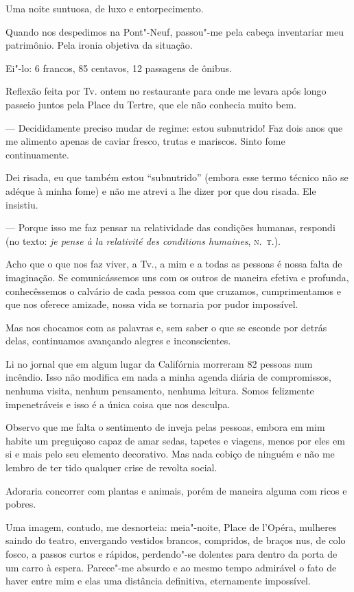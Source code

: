 Uma noite suntuosa, de luxo e entorpecimento.

Quando nos despedimos na Pont"-Neuf, passou"-me pela cabeça inventariar
meu patrimônio. Pela ironia objetiva da situação.

Ei"-lo: 6 francos, 85 centavos, 12 passagens de ônibus.

\pagebreak
\asterisc

Reflexão feita por Tv. ontem no restaurante para onde me levara após
longo passeio juntos pela Place du Tertre, que ele não conhecia muito
bem.

--- Decididamente preciso mudar de regime: estou subnutrido! Faz dois anos que me alimento apenas de caviar fresco, trutas e mariscos. Sinto fome continuamente.

Dei risada, eu que também estou ``subnutrido'' (embora esse termo
técnico não se adéque à minha fome) e não me atrevi a lhe dizer por que
dou risada. Ele insistiu.

--- Porque isso me faz pensar na relatividade das condições humanas, respondi (no texto: \emph{je pense à la relativité des conditions humaines}, \textsc{n.~t.}).

\asterisc

Acho que o que nos faz viver, a Tv., a mim e a todas as pessoas é
nossa falta de imaginação. Se comunicássemos uns com os outros de
maneira efetiva e profunda, conhecêssemos o calvário de cada pessoa
com que cruzamos, cumprimentamos e que nos oferece amizade, nossa
vida se tornaria por pudor impossível.

Mas nos chocamos com as palavras e, sem saber o que se esconde por
detrás delas, continuamos avançando alegres e inconscientes.

Li no jornal que em algum lugar da Califórnia morreram 82 pessoas num
incêndio. Isso não modifica em nada a minha agenda diária de
compromissos, nenhuma visita, nenhum pensamento, nenhuma leitura. Somos
felizmente impenetráveis e isso é a única coisa que nos desculpa.

\asterisc

Observo que me falta o sentimento de inveja pelas pessoas, embora em mim
habite um preguiçoso capaz de amar sedas, tapetes e viagens, menos por
eles em si e mais pelo seu elemento decorativo. Mas nada cobiço de
ninguém e não me lembro de ter tido qualquer crise de revolta social.

Adoraria concorrer com plantas e animais, porém de maneira alguma com
ricos e pobres.

Uma imagem, contudo, me desnorteia: meia"-noite, Place de l'Opéra,
mulheres saindo do teatro, envergando vestidos brancos, compridos, de
braços nus, de colo fosco, a passos curtos e rápidos, perdendo"-se
dolentes para dentro da porta de um carro à espera. Parece"-me absurdo e
ao mesmo tempo admirável o fato de haver entre mim e elas uma
distância definitiva, eternamente impossível.

